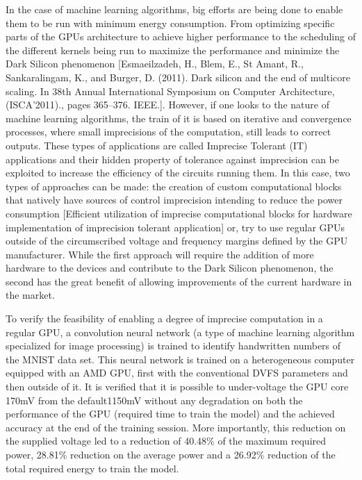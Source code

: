In the case of machine learning algorithms, big efforts are being done to enable them to be run with minimum energy consumption. From optimizing specific parts of the GPUs architecture to achieve higher performance to the scheduling of the different kernels being run to maximize the performance and minimize the Dark Silicon phenomenon [Esmaeilzadeh, H., Blem, E., St Amant, R., Sankaralingam, K., and Burger, D. (2011). Dark silicon and the end of multicore scaling. In 38th Annual International Symposium on Computer Architecture, (ISCA’2011)., pages 365–376. IEEE.]. However, if one looks to the nature of machine learning algorithms, the train of it is based on iterative and convergence processes, where small imprecisions of the computation, still leads to correct outputs. These types of applications are called Imprecise Tolerant (IT) applications and their hidden property of tolerance against imprecision can be exploited to increase the efficiency of the circuits running them. In this case, two types of approaches can be made: the creation of custom computational blocks that natively have sources of control imprecision intending to reduce the power consumption [Efficient utilization of imprecise computational blocks for hardware implementation of imprecision tolerant application] or, try to use regular GPUs outside of the circumscribed voltage and frequency margins defined by the GPU manufacturer. While the first approach will require the addition of more hardware to the devices and contribute to the Dark Silicon phenomenon, the second has the great benefit of allowing improvements of the current hardware in the market. 

To verify the feasibility of enabling a degree of imprecise computation in a regular GPU, a convolution neural network (a type of machine learning algorithm specialized for image processing) is trained to identify handwritten numbers of the MNIST data set. This neural network is trained on a heterogeneous computer equipped with an AMD GPU, first with the conventional DVFS parameters and then outside of it. It is verified that it is possible to under-voltage the GPU core 170mV from the default1150mV without any degradation on both the performance of the GPU (required time to train the model) and the achieved accuracy at the end of the training session. More importantly, this reduction on the supplied voltage led to a reduction of 40.48\% of the maximum required power,  28.81\% reduction on the average power and a 26.92\% reduction of the total required energy to train the model.


